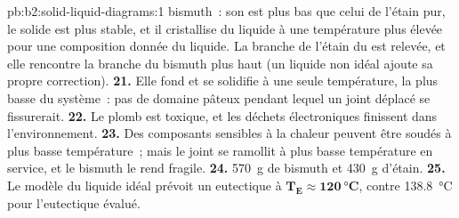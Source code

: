 \begin{solution}{pb:b2:solid-liquid-diagrams:1}
bismuth~: son  est plus bas que celui de l'étain pur, le solide est
plus stable, et il cristallise du liquide à une température plus élevée pour une
composition donnée du liquide. La branche de l'étain du  est relevée, et elle
rencontre la branche du bismuth plus haut (un liquide non idéal ajoute sa propre correction).
\textbf{21.} Elle fond et se solidifie à une seule température, la plus basse du système~:
pas de domaine pâteux pendant lequel un joint déplacé se fissurerait.
\textbf{22.} Le plomb est toxique, et les déchets électroniques finissent dans l'environnement.
\textbf{23.} Des composants sensibles à la chaleur peuvent être soudés à plus basse température~;
mais le joint se ramollit à plus basse température en service, et le bismuth le rend
fragile.
\textbf{24.} \qty{570}{g} de bismuth et \qty{430}{g} d'étain.
\textbf{25.} Le modèle du liquide idéal prévoit un eutectique à $\boldsymbol{T_E
\approx \qty{120}{\degreeCelsius}}$, contre \qty{138.8}{\degreeCelsius}
pour l'eutectique évalué.
\end{solution}
